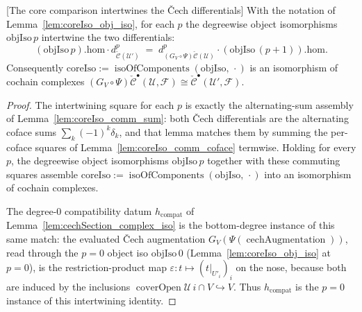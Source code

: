 \begin{lemma}

[The core comparison intertwines the {\v C}ech differentials]
  \label{lem:coreIso_comm}
  With the notation of Lemma~\ref{lem:coreIso_obj_iso}, for each \(p\) the degreewise object
  isomorphisms \(\mathrm{objIso}\,p\) intertwine the two differentials:
  \[
    (\mathrm{objIso}\,p).\mathrm{hom} \cdot
      d^{p}_{\check{\mathcal{C}}(\mathcal{U}')}
      \;=\;
    d^{p}_{(G_V\circ\Psi)\check{\mathcal{C}}(\mathcal{U})} \cdot
      (\mathrm{objIso}\,(p+1)).\mathrm{hom}.
  \]
  Consequently \(\mathrm{coreIso} := \operatorname{isoOfComponents}(\mathrm{objIso},\,\cdot)\)
  is an isomorphism of cochain complexes \((G_V\circ\Psi)\check{\mathcal{C}}^\bullet(\mathcal{U},
  \mathcal{F}) \cong \check{\mathcal{C}}^\bullet(\mathcal{U}', \mathcal{F})\).
\end{lemma}
\begin{proof}
  The intertwining square for each \(p\) is exactly the alternating-sum assembly of
  Lemma~\ref{lem:coreIso_comm_sum}: both {\v C}ech differentials are the alternating coface sums
  \(\sum_k (-1)^k \delta_k\), and that lemma matches them by summing the per-coface squares of
  Lemma~\ref{lem:coreIso_comm_coface} termwise. Holding for every \(p\), the degreewise object
  isomorphisms \(\mathrm{objIso}\,p\) together with these commuting squares assemble
  \(\mathrm{coreIso} := \operatorname{isoOfComponents}(\mathrm{objIso},\,\cdot)\) into an
  isomorphism of cochain complexes.

  The degree-\(0\) compatibility datum \(h_{\mathrm{compat}}\) of
  Lemma~\ref{lem:cechSection_complex_iso} is the bottom-degree instance of this same match: the
  evaluated {\v C}ech augmentation \(G_V(\Psi(\operatorname{cechAugmentation}))\), read through
  the \(p=0\) object iso \(\mathrm{objIso}\,0\) (Lemma~\ref{lem:coreIso_obj_iso} at \(p=0\)), is
  the restriction-product map \(\varepsilon\colon t \mapsto (t|_{U'_i})_i\) on the nose, because
  both are induced by the inclusions \(\operatorname{coverOpen}\mathcal{U}\,i \cap V
  \hookrightarrow V\). Thus \(h_{\mathrm{compat}}\) is the \(p=0\) instance of this intertwining
  identity.
\end{proof}


